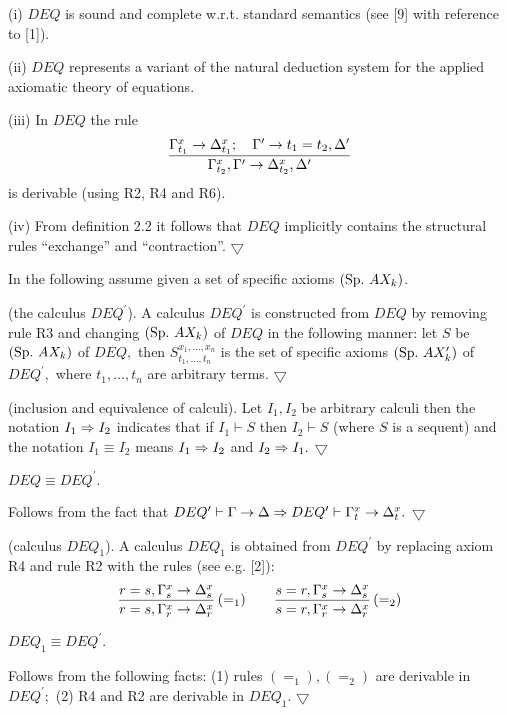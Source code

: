 
(i) $DEQ$ is sound and complete w.r.t. standard semantics (see [9]
with reference to [1]).

(ii) $DEQ$ represents a variant of the  natural deduction system for the
applied axiomatic theory of equations.

(iii) In $DEQ$  the rule
$${\Gamma^x_{t_1}\to \Delta^x_{t_1};\quad \Gamma^\prime\to t_1=t_2,
\Delta^\prime\over
\Gamma^x_{t_2}, \Gamma^\prime\to \Delta^x_{t_2}, \Delta^\prime}$$
is derivable (using R2, R4 and R6).

(iv) From  definition 2.2 it follows that $DEQ$ implicitly contains
the structural rules ``exchange'' and ``contraction''.
$\bigtriangledown$

In the following assume given a set of specific axioms $({\rm Sp.}\ AX_k)$.

 (the calculus $DEQ^\prime$). A calculus
$DEQ^\prime$ is constructed from $DEQ$ by removing rule R3 and
changing $({\rm Sp.}\ AX_k)$ of $DEQ$ in the following manner: let $S$
be $({\rm Sp.}\ AX_k)$ of $DEQ,$ then $S^{x_1,\ldots,
x_n}_{t_1,\ldots, t_n}$ is the set of specific axioms $({\rm Sp.}\
AX^\prime_k)$ of $DEQ^\prime,$ where $t_1, \ldots , t_n$ are arbitrary
terms.  $\bigtriangledown$

 (inclusion and equivalence of calculi). Let $I_1, I_2$
be arbitrary calculi then the notation $I_1 \Rightarrow I_2$ indicates that
if $I_1\vdash S$ then $I_2\vdash S$ (where $S$ is a sequent) and the
notation $I_1\equiv I_2$ means $I_1\Rightarrow I_2$ and $I_2\Rightarrow I_1.$
$\bigtriangledown$

 $DEQ\equiv DEQ^\prime.$

 Follows from the fact that $DEQ^\prime\vdash \Gamma\to
\Delta\Rightarrow DEQ^\prime\vdash \Gamma^x_t\to \Delta^x_t.$ $\bigtriangledown$



 (calculus $DEQ_1$). A calculus $DEQ_1$ is
obtained from $DEQ^\prime$ by replacing axiom R4 and rule R2 with the
rules (see e.g. [2]): $${r=s, \Gamma^x_s\to \Delta^x_s\over r=s,
\Gamma^x_r\to \Delta^x_r}\, (=_1)\qquad {s=r, \Gamma^x_s\to
\Delta^x_s\over s=r, \Gamma^x_r\to \Delta^x_r}\, (=_2)$$

 $DEQ_1\equiv DEQ^\prime.$

 Follows from the following facts: (1) rules $(=_1), (=_2)$ are
derivable in $DEQ^\prime;$  (2) R4 and R2 are derivable in $DEQ_1.$
$\bigtriangledown$
\vskip -6pt


